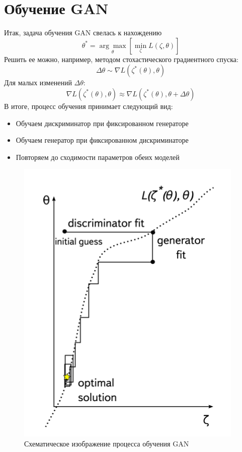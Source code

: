\documentclass[a4paper]{article}
\begin{document}
	\section{Обучение GAN}
		Итак, задача обучения GAN свелась к нахождению
		$$ \theta^* = \underset{\theta}{\arg\max} \left[ \underset{\zeta}{\min} L(\zeta, \theta) \right] $$
		Решить ее можно, например, методом стохастического градиентного спуска:
		$$ \Delta \theta \sim \nabla L(\zeta^*(\theta), \theta)$$
		Для малых изменений $\Delta \theta$:
		$$ \nabla L(\zeta^*(\theta), \theta) \approx \nabla L(\zeta^*(\theta), \theta + \Delta \theta) $$
		В итоге, процесс обучения принимает следующий вид:
		\begin{itemize}
				\item Обучаем дискриминатор при фиксированном генераторе
				\item Обучаем генератор при фиксированном дискриминаторе
				\item Повторяем до сходимости параметров обеих моделей
		\end{itemize}
		\begin{figure}
			\begin{center}
				\includegraphics[width=0.4\linewidth]{gan-training}
			\end{center}
			\caption{Схематическое изображение процесса обучения GAN}
		\end{figure}
\end{document}

